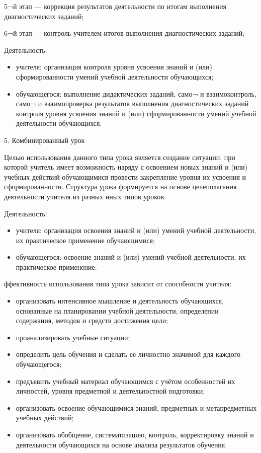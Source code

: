 \documentclass[
  11pt,
  russian,
]{book}
\begin{document}
5¬й этап --- коррекция результатов деятельности по итогам выполнения диагностических заданий;

6¬й этап --- контроль учителем итогов выполнения диагностических заданий;

Деятельность:

\begin{itemize}
\item
  учителя: организация контроля уровня усвоения знаний и (или) сформированности умений учебной деятельности обучающихся;
\item
  обучающегося: выполнение дидактических заданий, само¬ и взаимоконтроль, само¬ и взаимопроверка результатов выполнения диагностических заданий контроля уровня усвоения знаний и (или) сформированности умений учебной деятельности обучающихся.
\end{itemize}

5. Комбинированный урок

Целью использования данного типа урока является создание ситуации, при которой учитель имеет возможность наряду с освоением новых знаний и (или) учебных действий обучающимися провести закрепление уровня их усвоения и сформированности. Структура урока формируется на основе целеполагания деятельности учителя из разных иных типов уроков.

Деятельность:

\begin{itemize}
\item
  учителя: организация освоения знаний и (или) умений учебной деятельности, их практическое применение обучающимися;
\item
  обучающегося: освоение знаний и (или) умений учебной деятельности, их практическое применение.
\end{itemize}

ффективность использования типа урока зависит от способности учителя:

\begin{itemize}
\item
  организовать интенсивное мышление и деятельность обучающихся, основанные на планировании учебной деятельности, определении содержания, методов и средств достижения цели;
\item
  проанализировать учебные ситуации;
\item
  определить цель обучения и сделать её личностно значимой для каждого обучающегося;
\item
  предъявить учебный материал обучающимся с учётом особенностей их личностей, уровня предметной и деятельностной подготовки;
\item
  организовать освоение обучающимися знаний, предметных и метапредметных учебных действий;
\item
  организовать обобщение, систематизацию, контроль, корректировку знаний и деятельности обучающихся на основе анализа результатов обучения.
\end{itemize}
\end{document}
